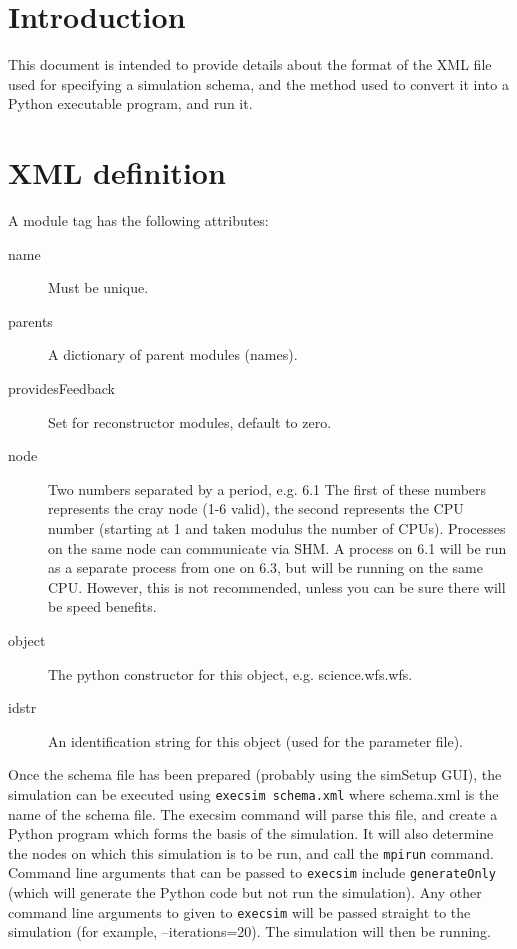 \documentclass{article}
\begin{document}



\section{Introduction}
This document is intended to provide details about the format of the
XML file used for specifying a simulation schema, and the method used
to convert it into a Python executable program, and run it.

\section{XML definition}
A module tag has the following attributes:
\begin{description}
\item[name]  Must be unique.
\item[parents] A dictionary of parent modules (names).
\item[providesFeedback] Set for reconstructor modules, default to zero.
\item[node] Two numbers separated by a period, e.g. 6.1  The first of
  these numbers represents the cray node (1-6 valid), the second
  represents the CPU number (starting at 1 and taken modulus the
  number of CPUs).  Processes on the same node
  can communicate via SHM.  A process on 6.1 will be run as a separate
  process from one on 6.3, but will be running on the same CPU.
  However, this is not recommended, unless you can be sure there will
  be speed benefits.
\item[object] The python constructor for this object,
  e.g. science.wfs.wfs.
\item[idstr] An identification string for this object (used for the
  parameter file).
\end{description}

Once the schema file has been prepared (probably using the simSetup
GUI), the simulation can be executed using \texttt{execsim schema.xml}
where schema.xml is the name of the schema file.  The execsim command
will parse this file, and create a Python program which forms the
basis of the simulation.  It will also determine the nodes on which
this simulation is to be run, and call the \texttt{mpirun} command.
Command line arguments that can be passed to \texttt{execsim} include
\texttt{generateOnly} (which will generate the Python code but not run
the simulation).  Any other command line arguments to given to
\texttt{execsim} will be passed straight to the simulation (for
example, --iterations=20).  The simulation will then be running.
\end{document}
